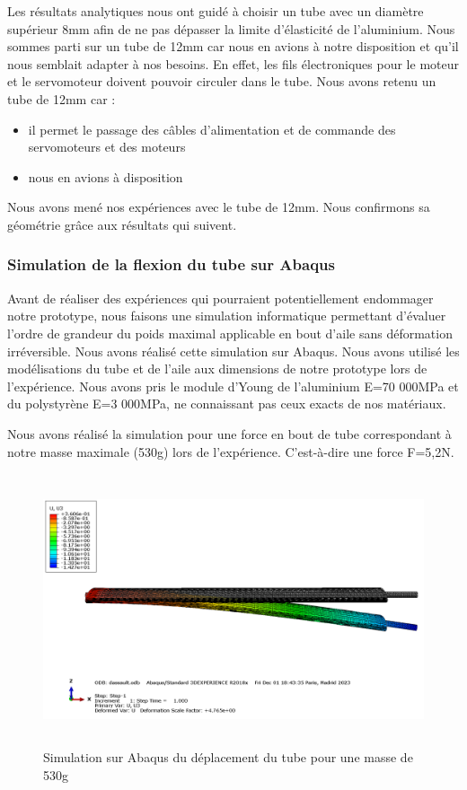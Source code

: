 \documentclass[a4paper,12pt,french]{report}
\begin{document}
Les résultats analytiques nous ont guidé à choisir un tube avec un diamètre supérieur 8mm afin de ne pas dépasser la limite d'élasticité de l'aluminium. Nous sommes parti sur un tube de 12mm car nous en avions à notre disposition et qu'il nous semblait adapter à nos besoins. En effet, les fils électroniques pour le moteur et le servomoteur doivent pouvoir circuler dans le tube.\newline
Nous avons retenu un tube de 12mm car :
\begin{itemize}
    \item il permet le passage des câbles d’alimentation et de commande des servomoteurs et des moteurs
    \item nous en avions à disposition
\end{itemize}

Nous avons mené nos expériences avec le tube de 12mm. Nous confirmons sa géométrie grâce aux résultats qui suivent.

\subsubsection{Simulation de la flexion du tube sur Abaqus}

Avant de réaliser des expériences qui pourraient potentiellement endommager notre prototype, nous faisons une simulation informatique permettant d’évaluer l'ordre de grandeur du poids maximal applicable en bout d’aile sans déformation irréversible. Nous avons réalisé cette simulation sur Abaqus. Nous avons utilisé les modélisations du tube et de l'aile aux dimensions de notre prototype lors de l'expérience. Nous avons pris le module d'Young de l'aluminium E=70 000MPa et du polystyrène E=3 000MPa, ne connaissant pas ceux exacts de nos matériaux.\newline

Nous avons réalisé la simulation pour une force en bout de tube correspondant à notre masse maximale (530g) lors de l'expérience. C'est-à-dire une force F=5,2N.\newline

\begin{figure}[h]
    \centering
    \includegraphics[height=8cm]{figures/simu.png}
    \caption{Simulation sur Abaqus du déplacement du tube pour une masse de 530g}
    \label{dep}
\end{figure}
\end{document}
